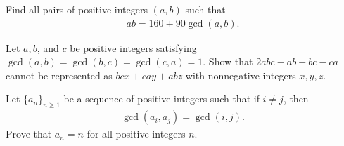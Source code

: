 \documentclass{subfile}
\begin{document}
	\begin{problem}
		Find all pairs of positive integers $(a, b)$ such that
			\begin{align*}
				ab=160 + 90 \gcd(a,b).
			\end{align*}
	\end{problem}


	\begin{problem}
		Let $a, b$, and $c$ be positive integers satisfying $\gcd (a, b) = \gcd (b, c) = \gcd (c, a) = 1$. Show that $2abc-ab-bc-ca$ cannot be represented as $bcx+cay +abz$ with nonnegative integers $x, y, z$. %
	\end{problem}


	\begin{problem}
		Let $\{a_n\}_{n\geq 1}$ be a sequence of positive integers such that if $i \neq j$, then
			\begin{align*}
				\gcd(a_i,a_j)=\gcd(i,j).
			\end{align*}
		Prove that $a_n=n$ for all positive integers $n$. %
	\end{problem}

\end{document}
